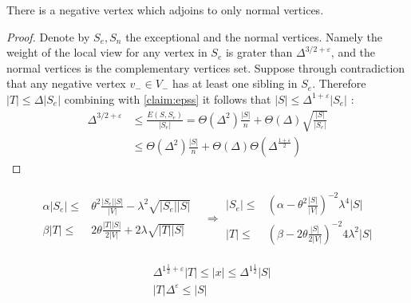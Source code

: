 \begin{claim}
  There is a negative vertex which adjoins to only normal vertices. 
\end{claim}
\begin{proof}
  Denote by $S_{e},S_{n}$ the exceptional and the normal vertices. Namely the weight of the local view for any vertex in $S_{e}$ is grater than $\Delta^{3/2 + \varepsilon}$, and the normal vertices is the complementary vertices set. Suppose through contradiction that any negative vertex $v_{-}\in V_{-}$ has at least one sibling in $S_{e}$. Therefore $|T| \le \Delta |S_{e}|$ combining with \cref{claim:epss} it follows that $|S| \le \Delta^{1+\varepsilon}|S_{e}|$ : 
  \begin{equation*}
    \begin{split}
      \Delta^{3/2 + \varepsilon} & \le \frac{E(S,S_{e})}{|S_{e}|} = \Theta\left( \Delta^{2} \right)\frac{|S|}{n} + \Theta\left( \Delta \right)\sqrt{ \frac{|S|}{|S_{e}|}  }\\ 
      & \le \Theta(\Delta^{2}) \frac{|S|}{n} + \Theta(\Delta) \Theta\left( \Delta^{\frac{1+\varepsilon}{2}} \right)  
    \end{split}
  \end{equation*} 
 \end{proof}

\begin{equation*}
  \begin{split}
    \begin{matrix}
   \alpha  |S_{e}|  \le &\theta^{2}\frac{|S_{e}||S|}{|V|} - \lambda^{2}\sqrt{ |S_{e}||S| } \\
   \beta |T|   \le  &2\theta \frac{|T||S|}{2|V|} +2 \lambda\sqrt{ |T||S| }  
 \end{matrix}
 & \Rightarrow \begin{matrix}
 |S_{e}|  \le &\left( \alpha -   \theta^{2} \frac{|S|}{|V|} \right)^{-2} \lambda^{4} |S| \\
 |T|  \le &\left( \beta -   2 \theta \frac{|S|}{2|V|} \right)^{-2} 4\lambda^{2} |S|
 \end{matrix}
 \end{split}
\end{equation*}

\begin{equation*} 
  \begin{split}
   & \Delta^{1\frac{1}{2} + \varepsilon}|T| \le |x| \le  \Delta^{1\frac{1}{2}}|S| \\
   & |T| \Delta^{\varepsilon} \le |S|
  \end{split}
\end{equation*}




